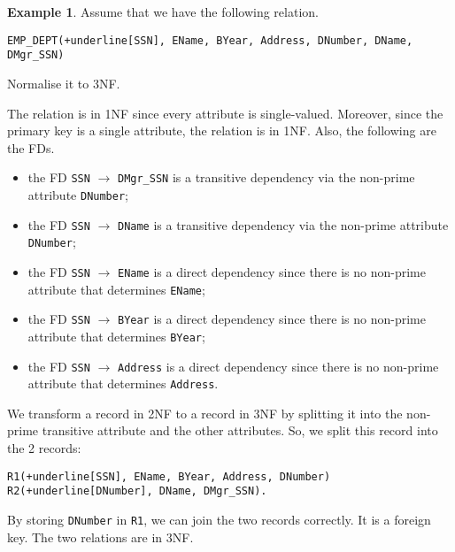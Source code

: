 \documentclass[a4paper, openany]{memoir}
\theoremstyle{definition}
\newtheorem{example}[subsection]{Example}
\begin{document}
    \begin{example}
        Assume that we have the following relation.
\begin{Verbatim}[commandchars=+\[\]]
EMP_DEPT(+underline[SSN], EName, BYear, Address, DNumber, DName, DMgr_SSN)
\end{Verbatim}
    Normalise it to 3NF.
    \end{example}
    \begin{answer}
        The relation is in 1NF since every attribute is single-valued. Moreover, since the primary key is a single attribute, the relation is in 1NF. Also, the following are the FDs.
        \begin{itemize}
            \item the FD \texttt{SSN} $\to$ \texttt{DMgr\_SSN} is a transitive dependency via the non-prime attribute \texttt{DNumber};
            \item the FD \texttt{SSN} $\to$ \texttt{DName} is a transitive dependency via the non-prime attribute \texttt{DNumber};
            \item the FD \texttt{SSN} $\to$ \texttt{EName} is a direct dependency since there is no non-prime attribute that determines \texttt{EName};
            \item the FD \texttt{SSN} $\to$ \texttt{BYear} is a direct dependency since there is no non-prime attribute that determines \texttt{BYear};
            \item the FD \texttt{SSN} $\to$ \texttt{Address} is a direct dependency since there is no non-prime attribute that determines \texttt{Address}.
        \end{itemize}
        We transform a record in 2NF to a record in 3NF by splitting it into the non-prime transitive attribute and the other attributes. So, we split this record into the 2 records:
\begin{Verbatim}[commandchars=+\[\]]
R1(+underline[SSN], EName, BYear, Address, DNumber)
R2(+underline[DNumber], DName, DMgr_SSN).
\end{Verbatim}
        By storing \texttt{DNumber} in \texttt{R1}, we can join the two records correctly. It is a foreign key. The two relations are in 3NF.
    \end{answer}
\end{document}
